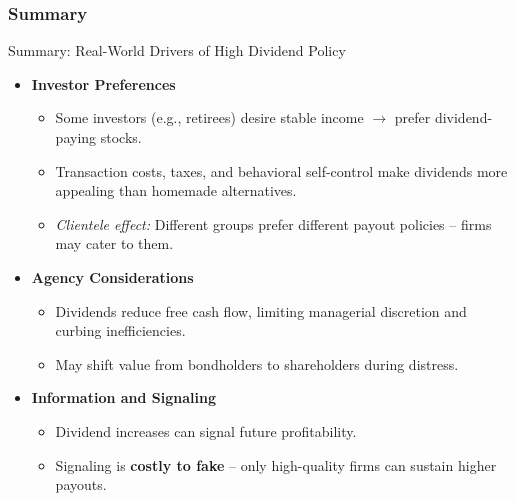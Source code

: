 \subsubsection*{Summary}
\begin{frame}{Summary: Real-World Drivers of High Dividend Policy}
\footnotesize
\begin{itemize}
    \item \textbf{Investor Preferences}
    \begin{itemize}
        \item Some investors (e.g., retirees) desire stable income $\rightarrow$ prefer dividend-paying stocks.
        \item Transaction costs, taxes, and behavioral self-control make dividends more appealing than homemade alternatives.
        \item \textit{Clientele effect:} Different groups prefer different payout policies -- firms may cater to them.
    \end{itemize}
    \item \textbf{Agency Considerations}
    \begin{itemize}
        \item Dividends reduce free cash flow, limiting managerial discretion and curbing inefficiencies.
        \item May shift value from bondholders to shareholders during distress.
    \end{itemize}
    \item \textbf{Information and Signaling}
    \begin{itemize}
        \item Dividend increases can signal future profitability.
        \item Signaling is \textbf{costly to fake} -- only high-quality firms can sustain higher payouts.
    \end{itemize}
\end{itemize}
\end{frame}

